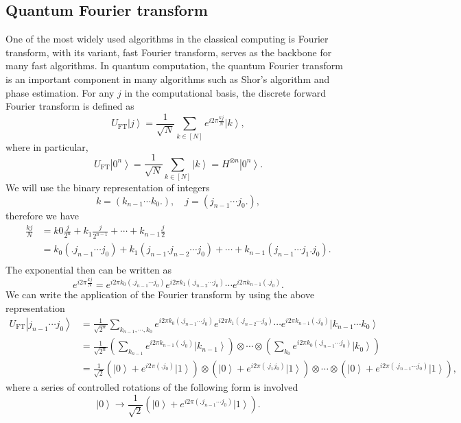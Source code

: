 \documentclass[11pt]{article}
\newcommand{\ket}[1]{\left|#1\right\rangle}
\begin{document}
\subsection{Quantum Fourier transform}
One of the most widely used algorithms in the classical computing is Fourier transform, with its variant, fast Fourier transform, serves as the backbone for many fast algorithms. In quantum computation, the quantum Fourier transform is an important component in many algorithms such as Shor's algorithm and phase estimation. For any $j$ in the computational basis, the discrete forward Fourier transform is defined as 
\begin{equation}
    U_{\text{FT}}\ket{j} = \frac{1}{\sqrt{N}}\sum_{k\in[N]}e^{i2\pi \frac{kj}{N}}\ket{k},
\end{equation} 
where in particular,
\begin{equation}
    U_{\text{FT}}\ket{0^n} = \frac{1}{\sqrt{N}}\sum_{k\in[N]}\ket{k} = H^{\otimes n}\ket{0^n}.
\end{equation}
We will use the binary representation of integers 
\begin{equation}
    k = (k_{n-1}\cdots k_0.),\quad j = (j_{n-1}\cdots j_0.),
\end{equation}
therefore we have 
\begin{align}
    \frac{kj}{N} &= k0\frac{j}{2^n} + k_1\frac{j}{2^{n-1}} + \cdots + k_{n-1}\frac{j}{2} \nonumber\\
    &= k_0(.j_{n-1}\cdots j_0) + k_1(j_{n-1}.j_{n-2}\cdots j_0) + \cdots + k_{n-1}(j_{n-1}\cdots j_1.j_0). \nonumber\\
\end{align}
The exponential then can be written as 
\begin{equation}
    e^{i2\pi\frac{kj}{N}} = e^{i2\pi k_0(.j_{n-1}\cdots j_0)}e^{i2\pi k_1(.j_{n-2}\cdots j_0)}\cdots e^{i2\pi k_{n-1}(.j_0)}.
\end{equation}
We can write the application of the Fourier transform by using the above representation
\begin{align}
    U_{\text{FT}}\ket{j_{n-1}\cdots j_0} &= \frac{1}{\sqrt{2^n}}\sum_{k_{n-1},\cdots ,k_0}e^{i2\pi k_0(.j_{n-1}\cdots j_0)}e^{i2\pi k_1(.j_{n-2}\cdots j_0)}\cdots e^{i2\pi k_{n-1}(.j_0)}\ket{k_{n-1}\cdots k_0}\nonumber \\
    &= \frac{1}{\sqrt{2^n}}\left(\sum_{k_{n-1}}e^{i2\pi k_{n-1}(.j_0)}\ket{k_{n-1}}\right)\otimes\cdots\otimes\left(\sum_{k_{0}}e^{i2\pi k_{0}(.j_{n-1}\cdots j_0)}\ket{k_{0}}\right) \nonumber\\
    &= \frac{1}{\sqrt{2}}\left(\ket{0} + e^{i2\pi(.j_0)}\ket{1}\right)\otimes\left(\ket{0} + e^{i2\pi(.j_1j_0)}\ket{1}\right)\otimes\cdots\otimes\left(\ket{0} + e^{i2\pi(.j_{n-1}\cdots j_0)}\ket{1}\right),
\end{align}
where a series of controlled rotations of the following form is involved 
\begin{equation}
    \ket{0} \rightarrow \frac{1}{\sqrt{2}}\left(\ket{0} + e^{i2\pi(.j_{n-1}\cdots j_0)}\ket{1}\right).
\end{equation}
\end{document}
